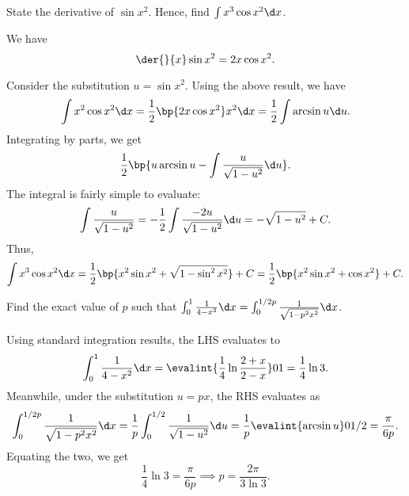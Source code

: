 \clearpage
\begin{problem}
    State the derivative of $\sin x^2$. Hence, find $\int x^3 \cos x^2 \d x$.
\end{problem}
\begin{solution}
    We have \[\der{}{x} \sin x^2 = 2x \cos x^2.\]

    Consider the substitution $u = \sin x^2$. Using the above result, we have \[\int x^2 \cos x^2 \d x =\frac12 \bp{2x \cos x^2} x^2 \d x = \frac12 \int \arcsin u \d u.\] Integrating by parts, we get \[\frac12 \bp{u \arcsin u - \int \frac{u}{\sqrt{1 - u^2}} \d u}.\] The integral is fairly simple to evaluate: \[\int \frac{u}{\sqrt{1 - u^2}} = -\frac12 \int \frac{-2u}{\sqrt{1 - u^2}} \d u = -\sqrt{1 - u^2} + C.\] Thus, \[\int x^3 \cos x^2 \d x = \frac12 \bp{x^2 \sin x^2 + \sqrt{1 - \sin^2 x^2}} + C = \frac12 \bp{x^2 \sin x^2 + \cos x^2} + C.\]
\end{solution}

\begin{problem}
    Find the exact value of $p$ such that $\int_0^1 \frac1{4 - x^2} \d x = \int_0^{1/2p} \frac1{\sqrt{1 - p^2 x^2}} \d x$.
\end{problem}
\begin{solution}
    Using standard integration results, the LHS evaluates to \[\int_0^1 \frac1{4 - x^2} \d x = \evalint{\frac1{4} \ln \frac{2 + x}{2 - x}}01 = \frac14 \ln 3.\] Meanwhile, under the substitution $u = px$, the RHS evaluates as \[\int_0^{1/2p} \frac1{\sqrt{1 - p^2 x^2}} \d x = \frac1p \int_0^{1/2} \frac1{\sqrt{1 - u^2}} \d u = \frac1p \evalint{\arcsin u}0{1/2} = \frac{\pi}{6p}.\] Equating the two, we get \[\frac14 \ln 3 = \frac{\pi}{6p} \implies p = \frac{2\pi}{3\ln3}.\]
\end{solution}

